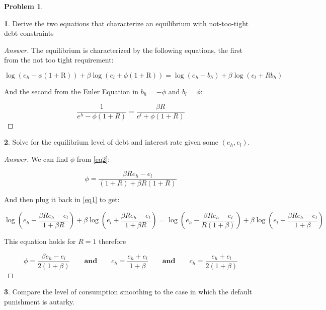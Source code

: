 \documentclass[12pt]{article}
\theoremstyle{definition}
\newtheorem{problem}{Problem}
\newtheorem{subproblem}{}[problem]
\newcommand{\qaq}{\qquad \textbf{and} \qquad}
\begin{document}
\begin{problem}
\begin{subproblem}
Derive the two equations that characterize an equilibrium with not-too-tight debt constraints
\end{subproblem}
\begin{proof}[Answer]
The equilibrium is characterized by the following equations, the first from the not too tight requirement:

\begin{equation}\label{eq1}
   \log (e_h-\phi(1+\mathrm{R}))+\beta \log (e_l+\phi(1+\mathrm{R})) = \log{(e_h-b_h)}  + \beta\log{(e_l+R b_h)}
\end{equation}

And the second from the Euler Equation in $b_h = -\phi$ and $b_l = \phi$:

\begin{equation}\label{eq2}
\frac{1}{e^{h}-\phi(1+R)}=\frac{\beta R}{e^{l}+\phi(1+R)}
\end{equation}

\end{proof}

\begin{subproblem}
Solve for the equilibrium level of debt and interest rate given some $\left(e_{h}, e_{l}\right)$.
\end{subproblem}
\begin{proof}[Answer]

We can find $\phi$ from \eqref{eq2}:

\begin{equation}
\phi=\frac{\beta R e_{h}-e_{l}}{(1+R)+\beta R(1+R)}
\end{equation}

And then plug it back in \eqref{eq1} to get:

$$
 \log \left(e_h-\frac{\beta R e_{h}-e_{l}}{1+\beta R}\right)+\beta \log \left(e_l+\frac{\beta R e_{h}-e_{l}}{1+\beta R} \right) = \log \left(e_{h}-\frac{\beta R e_{h}-e_{l}}{R(1+\beta)}\right) + \beta \log \left(e_{l}+\frac{\beta R e_{h}-e_{l}}{1+\beta}\right)
 $$

This equation holds for $R = 1$ therefore 

$$\phi = \frac{\beta  e_{h}-e_{l}}{2(1+\beta)} \qaq c_h = \frac{e_h + e_l}{1+\beta} \qaq c_h = \frac{e_h + e_l}{2(1+\beta)} $$

\end{proof}

\begin{subproblem}
Compare the level of consumption smoothing to the case in which the default punishment is autarky.
\end{subproblem}


\end{problem}
\end{document}
